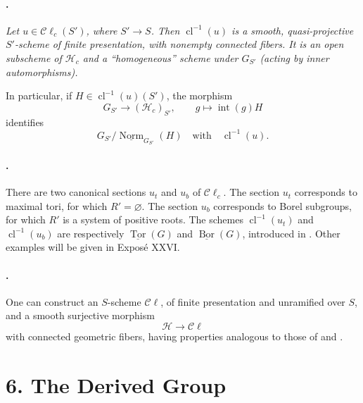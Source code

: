 \paragraph{.}
{\itshape Let \(u\in\mathcal C\ell_c(S')\), where \(S'\to S\).
Then \(\operatorname{cl}^{-1}(u)\) is a smooth,
quasi-projective \(S'\)-scheme of finite presentation, with
nonempty connected fibers. It is an open subscheme of
\(\mathcal H_c\) and a ``homogeneous'' scheme under \(G_{S'}\)
\textup{(acting by inner automorphisms)}.

In particular, if
\(H\in\operatorname{cl}^{-1}(u)(S')\), the morphism
\[
  G_{S'}\longrightarrow(\mathcal H_c)_{S'},\qquad
  g\longmapsto\operatorname{int}(g)H
\]
identifies
\[
  G_{S'}\big/
  \underline{\operatorname{Norm}}_{G_{S'}}(H)
  \quad\text{with}\quad
  \operatorname{cl}^{-1}(u).
\]}

\paragraph{.}
There are two canonical sections \(u_t\) and \(u_b\) of
\(\mathcal C\ell_c\). The section \(u_t\) corresponds to maximal
tori, for which \(R'=\varnothing\). The section \(u_b\) corresponds
to Borel subgroups, for which \(R'\) is a system of positive roots.
The schemes
\(\operatorname{cl}^{-1}(u_t)\) and
\(\operatorname{cl}^{-1}(u_b)\) are respectively
\(\underline{\operatorname{Tor}}(G)\) and
\(\underline{\operatorname{Bor}}(G)\), introduced in .
Other examples will be given in Exposé XXVI.

\paragraph{.}
One can construct an \(S\)-scheme \(\mathcal C\ell\), of finite
presentation and unramified over \(S\), and a smooth surjective
morphism
\[
  \mathcal H\longrightarrow\mathcal C\ell
\]
with connected geometric fibers, having properties analogous to
those of \textup{} and \textup{}.

\section*{6. The Derived Group}

